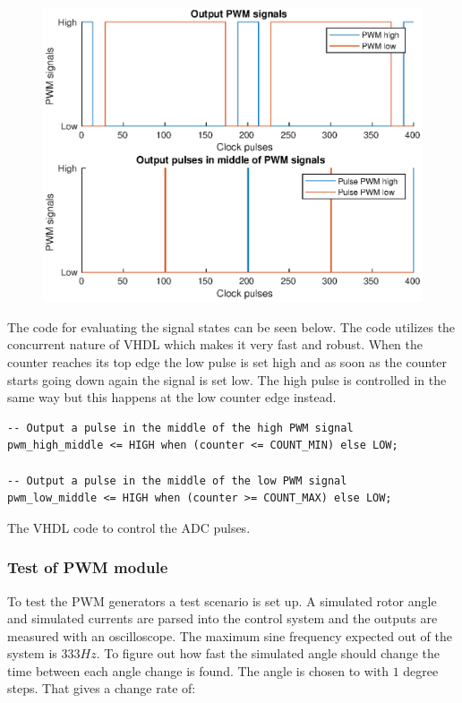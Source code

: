 \begin{figure}[H]
	\centering
	\includegraphics[width=0.8 \textwidth]{pictures/software/adc_pulses.eps}
	\caption{}
	\label{fig:adc_pulses}
\end{figure}

The code for evaluating the signal states can be seen below. The code utilizes the concurrent nature of VHDL which makes it very fast and robust.
When the counter reaches its top edge the low pulse is set high and as soon as the counter starts going down again the signal is set low. The high pulse is controlled in the same way but this happens at the low counter edge instead.

\begin{verbatim}
-- Output a pulse in the middle of the high PWM signal
pwm_high_middle <= HIGH when (counter <= COUNT_MIN) else LOW;

-- Output a pulse in the middle of the low PWM signal
pwm_low_middle <= HIGH when (counter >= COUNT_MAX) else LOW;
\end{verbatim}
\begin{center}
    The VHDL code to control the ADC pulses.
\end{center}


\subsubsection*{Test of PWM module}

To test the PWM generators a test scenario is set up. A simulated rotor angle and simulated currents are parsed into the control system and the outputs are measured with an oscilloscope. 
The maximum sine frequency expected out of the system is $333Hz$. To figure out how fast the simulated angle should change the time between each angle change is found. 
The angle is chosen to with $1$ degree steps. That gives a change rate of:


